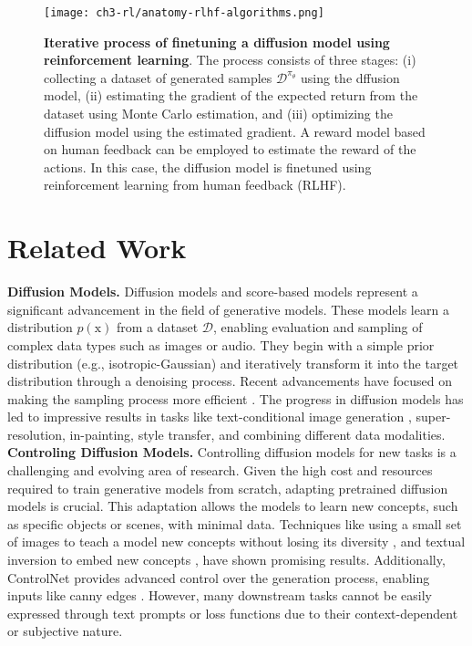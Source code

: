 \begin{figure}[ht]
  \centering
  \texttt{[image: ch3-rl/anatomy-rlhf-algorithms.png]}
  \captionsetup{width=\textwidth} %
  \caption{\textbf{Iterative process of finetuning a diffusion model using reinforcement learning}. The process consists of three stages: (i) collecting a dataset of generated samples $\mathcal{D}^{\pi_{\theta}}$ using the dffusion model, (ii) estimating the gradient of the expected return from the dataset using Monte Carlo estimation, and (iii) optimizing the diffusion model using the estimated gradient. A reward model based on human feedback can be employed to estimate the reward of the actions. In this case, the diffusion model is finetuned using reinforcement learning from human feedback (RLHF).}
  \label{fig:anatomy-rl-algo}
\end{figure}


\section{Related Work}

\noindent\textbf{Diffusion Models.} Diffusion models and score-based models represent a significant advancement in the field of generative models. These models learn a distribution $p(\mathrm{x})$ from a dataset $\mathcal{D}$, enabling evaluation and sampling of complex data types such as images or audio. They begin with a simple prior distribution (e.g., isotropic-Gaussian) and iteratively transform it into the target distribution through a denoising process. Recent advancements have focused on making the sampling process more efficient \cite{song2020denoising, nichol2021improved, Salimans2022ProgressiveDF}. The progress in diffusion models has led to impressive results in tasks like text-conditional image generation \cite{ramesh2022hierarchical, saharia2022photorealistic}, super-resolution, in-painting, style transfer, and combining different data modalities. \\

\noindent\textbf{Controling Diffusion Models.} Controlling diffusion models for new tasks is a challenging and evolving area of research. Given the high cost and resources required to train generative models from scratch, adapting pretrained diffusion models is crucial. This adaptation allows the models to learn new concepts, such as specific objects or scenes, with minimal data. Techniques like using a small set of images to teach a model new concepts without losing its diversity \cite{ruiz2023dreambooth}, and textual inversion to embed new concepts \cite{gal2022image}, have shown promising results. Additionally, ControlNet provides advanced control over the generation process, enabling inputs like canny edges \cite{zhang2023adding}. However, many downstream tasks cannot be easily expressed through text prompts or loss functions due to their context-dependent or subjective nature. \\

